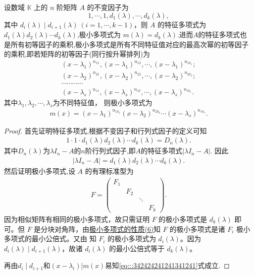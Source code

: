 \documentclass[../../main.tex]{subfiles}%
\begin{document}
\begin{theorem}[极小多项式就是幂次最大的不变因子]\label{theorem:极小多项式与不变因子的关系}
设数域 $\mathbb{K}$ 上的 $n$ 阶矩阵 $A$ 的不变因子为
\[
1,\cdots,1,d_1(\lambda),\cdots,d_k(\lambda),
\]
其中 $d_i(\lambda)\mid d_{i + 1}(\lambda)\ (i = 1,\cdots,k - 1)$，则 $A$ 的特征多项式为$d_1(\lambda)d_2(\lambda)\cdots d_k(\lambda)$,极小多项式为 $m(\lambda)=d_k(\lambda)$.进而$A$的特征多项式也是所有初等因子的乘积,极小多项式是所有不同特征值对应的最高次幂的初等因子的乘积,即若矩阵的初等因子(同行按升幂排列)为
\begin{gather*}
(x-\lambda _1)^{n_{11}},(x-\lambda _1)^{n_{12}},\cdots ,(x-\lambda _1)^{n_{1k_1}}; 
\\
(x-\lambda _2)^{n_{21}},(x-\lambda _2)^{n_{22}},\cdots ,(x-\lambda _2)^{n_{2k_2}}; 
\\
\cdots \cdots \cdots \cdots 
\\
(x-\lambda _s)^{n_{s1}},(x-\lambda _s)^{n_{s2}},\cdots ,(x-\lambda _s)^{n_{sk_s}}.
\end{gather*}
其中\(\lambda_1,\lambda_2,\cdots,\lambda_s\)为不同特征值，
则极小多项式为
\begin{align}\label{eq:::342424241241341241}
m(x)=(x-\lambda _1)^{n_{1k_1}}(x-\lambda _2)^{n_{2k_2}}\cdots (x-\lambda _s)^{n_{sk_s}}.
\end{align}
\end{theorem}
\begin{proof}

首先证明特征多项式,根据不变因子和行列式因子的定义可知
\begin{align*}
1\cdot 1\cdot d_1(\lambda)d_2(\lambda)\cdots d_k(\lambda)=D_n(\lambda).
\end{align*}
其中$D_n(\lambda)$为$\lambda I_n-A$的$n$阶行列式因子,即$A$的特征多项式$|\lambda I_n-A|$.
因此
\begin{align*}
|\lambda I_n-A|=d_1(\lambda)d_2(\lambda)\cdots d_k(\lambda).
\end{align*}
然后证明极小多项式,设 $A$ 的有理标准型为
\begin{align*}
F = \begin{pmatrix}
F_1 & & & \\
& F_2 & & \\
& & \ddots & \\
& & & F_k
\end{pmatrix}.
\end{align*}
因为相似矩阵有相同的极小多项式，故只需证明 $F$ 的极小多项式是 $d_k(\lambda)$ 即可。但 $F$ 是分块对角阵，由\hyperref[proposition:极小多项式的性质]{极小多项式的性质(6)}知 $F$ 的极小多项式是诸 $F_i$ 极小多项式的最小公倍式。又由 知 $F_i$ 的极小多项式为 $d_i(\lambda)$。因为 $d_i(\lambda)\mid d_{i + 1}(\lambda)$，故诸 $d_i(\lambda)$ 的最小公倍式等于 $d_k(\lambda)$。

再由$d_i\mid d_{i+1}$和$(x-\lambda_i)|m(x)$易知\eqref{eq:::342424241241341241}式成立.

\end{proof}
\end{document}
